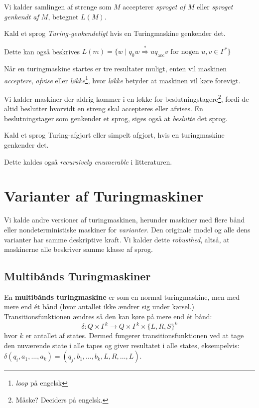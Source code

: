 Vi kalder samlingen af strenge som $M$ accepterer \textit{sproget af $M$} eller \textit{sproget genkendt af $M$}, betegnet $L(M)$.

\begin{definition}
Kald et sprog \textit{Turing-genkendeligt} hvis en Turingmaskine genkender det.
\end{definition}

Dette kan også beskrives $L(m) = \{w \mid q_{0}w \stackrel{*}{\Rightarrow} uq_{\text{acc}}v \text{ for nogen }u,v \in \Gamma^{*}\}$

Når en turingmaskine startes er tre resultater muligt, enten vil maskinen \textit{acceptere}, \textit{afvise} eller \textit{løkke}\footnote{\textit{loop} på engelsk}, hvor \textit{løkke} betyder at maskinen vil køre forevigt.



Vi kalder maskiner der aldrig kommer i en løkke for beslutningstagere\footnote{Måske? Deciders på engelsk.}, fordi de altid beslutter hvorvidt en streng skal accepteres eller afvises. En beslutningstager som genkender et sprog, siges også at \textit{beslutte} det sprog.

\begin{definition}
Kald et sprog Turing-afgjort eller simpelt afgjort, hvis en turingmaskine genkender det.
\end{definition}

Dette kaldes også \textit{recursively enumerable} i litteraturen.

\section{Varianter af Turingmaskiner}%
\label{sec:turingvariants}

Vi kalde andre versioner af turingmaskinen, herunder maskiner med flere bånd eller nondeterministiske maskiner for \textit{varianter}. Den originale model og alle dens varianter har samme deskriptive kraft. Vi kalder dette \textit{robusthed}, altså, at maskinerne alle beskriver samme klasse af sprog.

\subsection{Multibånds Turingmaskiner}%
\label{subsec:multitape}

En \textbf{multibånds turingmaskine} er som en normal turingmaskine, men med mere end ét bånd (hvor antallet ikke ændrer sig under kørsel.) Transitionsfunktionen ændres så den kan køre på mere end ét bånd:
\[ \delta : Q \times \Gamma^{k} \longrightarrow Q \times \Gamma^{k} \times \{L,R,S\}^{k}\] hvor $k$ er antallet af states. Dermed fungerer transitionsfunktionen ved at tage den nuværende state i alle tapes og giver resultatet i alle states, eksempelvis: $\delta(q_{i}, a_{1}, \ldots, a_{k}) = (q_{j}, b_{1}, \ldots, b_{k}, L, R, \ldots, L)$.

